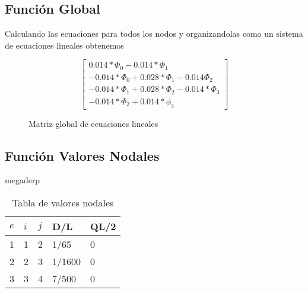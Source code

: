 \documentclass{article}
\begin{document}
\subsection{Función Global}
Calculando las ecuaciones para todos los nodos y organizandolas como un sistema de ecuaciones lineales obtenemos
\begin{figure}[!h]
    \[
        \begin{bmatrix}
            {0.014*\Phi_0 - 0.014*\Phi_1}\\
            {-0.014*\Phi_0 + 0.028*\Phi_1-0.014\Phi_2}\\
            {-0.014*\Phi_1 + 0.028*\Phi_2 - 0.014*\Phi_3}\\
            {-0.014*\Phi_2 + 0.014*\phi_3}
        \end{bmatrix}
    \]
    \caption{Matriz global de ecuaciones lineales}
    \end{figure}

\subsection{Función Valores Nodales}
megaderp
\begin{table}[!h]
    \centering
        \begin{tabular}{@{}lllll@{}}
        \toprule
        $e$ & $i$ & $j$ & D/L    & QL/2 \\ \midrule
        1 & 1 & 2 & 1/65   & 0    \\
        2 & 2 & 3 & 1/1600 & 0    \\
        3 & 3 & 4 & 7/500  & 0    \\ \bottomrule
    \end{tabular}
    \caption{Tabla de valores nodales}
\end{table}
\end{document}
